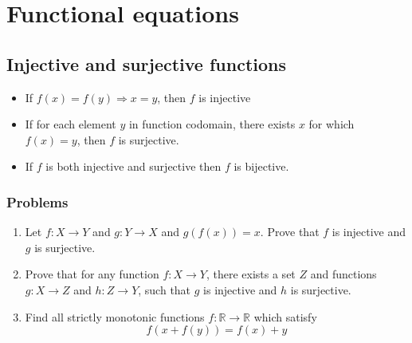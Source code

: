 \documentclass{article}
\begin{document}
\section*{Functional equations}

\subsection{Injective and surjective functions}
	\begin{itemize}
		\item 
		If $f(x)=f(y) \Rightarrow x=y$, then $f$ is injective
		\item 
		If for each element $y$ in function codomain, there exists $x$ for which $f(x)=y$, then $f$ is surjective.
		\item
		If $f$ is both injective and surjective then $f$ is bijective.
	\end{itemize}

	\subsubsection*{Problems}
		\begin{enumerate}
			\item
			Let $f: X \to Y$ and $g: Y \to X$ and $g(f(x))=x$. Prove that $f$ is injective and $g$ is surjective.
			\item 
			Prove that for any function $f: X \to Y$, there exists a set $Z$ and functions $g: X \to Z$ and $h: Z\to Y$, such that $g$ is injective and $h$ is surjective.
			\item 
			Find all strictly monotonic functions $f: \mathbb{R} \to \mathbb{R}$ which satisfy 
			$$f(x + f(y)) = f(x) + y$$
		\end{enumerate}
\end{document}
